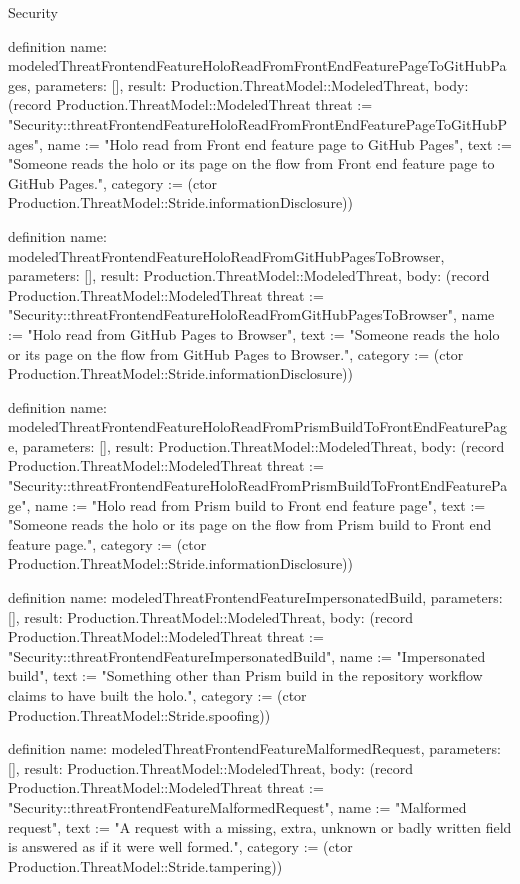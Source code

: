\begin{lexlean}{Security}
\begin{semanticmodule}
definition{
  name: modeledThreatFrontendFeatureHoloReadFromFrontEndFeaturePageToGitHubPages,
  parameters: [],
  result: Production.ThreatModel::ModeledThreat,
  body: (record Production.ThreatModel::ModeledThreat {threat := "Security::threatFrontendFeatureHoloReadFromFrontEndFeaturePageToGitHubPages", name := "Holo read from Front end feature page to GitHub Pages", text := "Someone reads the holo or its page on the flow from Front end feature page to GitHub Pages.", category := (ctor Production.ThreatModel::Stride.informationDisclosure)})
}

definition{
  name: modeledThreatFrontendFeatureHoloReadFromGitHubPagesToBrowser,
  parameters: [],
  result: Production.ThreatModel::ModeledThreat,
  body: (record Production.ThreatModel::ModeledThreat {threat := "Security::threatFrontendFeatureHoloReadFromGitHubPagesToBrowser", name := "Holo read from GitHub Pages to Browser", text := "Someone reads the holo or its page on the flow from GitHub Pages to Browser.", category := (ctor Production.ThreatModel::Stride.informationDisclosure)})
}

definition{
  name: modeledThreatFrontendFeatureHoloReadFromPrismBuildToFrontEndFeaturePage,
  parameters: [],
  result: Production.ThreatModel::ModeledThreat,
  body: (record Production.ThreatModel::ModeledThreat {threat := "Security::threatFrontendFeatureHoloReadFromPrismBuildToFrontEndFeaturePage", name := "Holo read from Prism build to Front end feature page", text := "Someone reads the holo or its page on the flow from Prism build to Front end feature page.", category := (ctor Production.ThreatModel::Stride.informationDisclosure)})
}

definition{
  name: modeledThreatFrontendFeatureImpersonatedBuild,
  parameters: [],
  result: Production.ThreatModel::ModeledThreat,
  body: (record Production.ThreatModel::ModeledThreat {threat := "Security::threatFrontendFeatureImpersonatedBuild", name := "Impersonated build", text := "Something other than Prism build in the repository workflow claims to have built the holo.", category := (ctor Production.ThreatModel::Stride.spoofing)})
}

definition{
  name: modeledThreatFrontendFeatureMalformedRequest,
  parameters: [],
  result: Production.ThreatModel::ModeledThreat,
  body: (record Production.ThreatModel::ModeledThreat {threat := "Security::threatFrontendFeatureMalformedRequest", name := "Malformed request", text := "A request with a missing, extra, unknown or badly written field is answered as if it were well formed.", category := (ctor Production.ThreatModel::Stride.tampering)})
}


\end{semanticmodule}
\end{lexlean}
